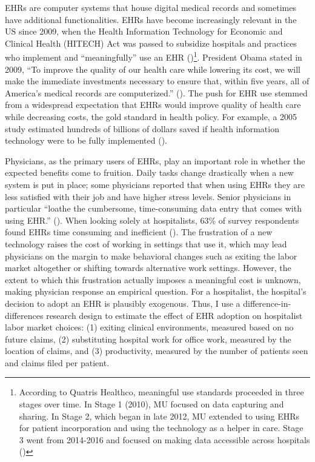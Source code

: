 \documentclass[12pt]{article}
\begin{document}
EHRs are computer systems that house digital medical records and sometimes have additional functionalities. EHRs have become increasingly relevant in the US since 2009, when the Health Information Technology for Economic and Clinical Health (HITECH) Act was passed to subsidize hospitals and practices who implement and ``meaningfully'' use an EHR (\cite{hitech})\footnote{According to Quatris Healthco, meaningful use standards proceeded in three stages over time. In Stage 1 (2010), MU focused on data capturing and sharing. In Stage 2, which began in late 2012, MU extended to using EHRs for patient incorporation and using the technology as a helper in care. Stage 3 went from 2014-2016 and focused on making data accessible across hospitals (\cite{meanuse})}. President Obama stated in 2009, “To improve the quality of our health care while lowering its cost, we will make the immediate investments necessary to ensure that, within five years, all of America’s medical records are computerized.” (\cite{presquote}). The push for EHR use stemmed from a widespread expectation that EHRs would improve quality of health care while decreasing costs, the gold standard in health policy. For example, a 2005 study estimated hundreds of billions of dollars saved if health information technology were to be fully implemented (\cite{hillestad2005}).

Physicians, as the primary users of EHRs, play an important role in whether the expected benefits come to fruition. Daily tasks change drastically when a new system is put in place; some physicians reported that when using EHRs they are less satisfied with their job and have higher stress levels. Senior physicians in particular “loathe the cumbersome, time-consuming data entry that comes with using EHR.” (\cite{CollierBurnout}). When looking solely at hospitalists, 63\% of survey respondents found EHRs time consuming and inefficient (\cite{czernik2022hospitalist}). The frustration of a new technology raises the cost of working in settings that use it, which may lead physicians on the margin to make behavioral changes such as exiting the labor market altogether or shifting towards alternative work settings. However, the extent to which this frustration actually imposes a meaningful cost is unknown, making physician response an empirical question. For a hospitalist, the hospital's decision to adopt an EHR is plausibly exogenous. Thus, I use a difference-in-differences research design to estimate the effect of EHR adoption on hospitalist labor market choices: (1) exiting clinical environments, measured based on no future claims, (2) substituting hospital work for office work, measured by the location of claims, and (3) productivity, measured by the number of patients seen and claims filed per patient.
\end{document}
